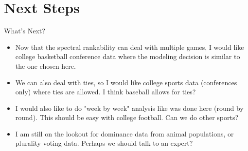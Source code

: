 \documentclass{beamer}
\begin{document}
\section{Next Steps}

\begin{frame}{What's Next?}
\begin{itemize}
\item	Now that the spectral rankability can deal with multiple games, I would like college basketball conference data where the modeling decision is similar to the one chosen here.
\vfill
\item	We can also deal with ties, so I would like college sports data (conferences only) where ties are allowed. I think baseball allows for ties?
\vfill
\item	I would also like to do "week by week" analysis like was done here (round by round).
	This should be easy with college football.
	Can we do other sports?
\vfill
\item	I am still on the lookout for dominance data from animal populations, or plurality voting data.
	Perhaps we should talk to an expert?
\end{itemize}
\end{frame}
\end{document}
